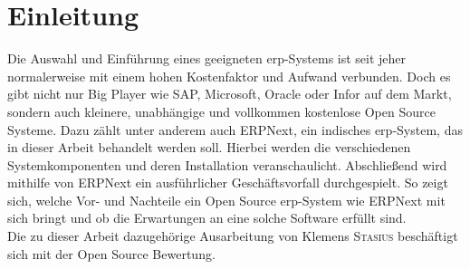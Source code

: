 \chapter{Einleitung}
\label{chap:einl}
Die Auswahl und Einführung eines geeigneten \gls{erp}-Systems ist seit jeher normalerweise mit einem hohen Kostenfaktor und Aufwand verbunden. Doch es gibt nicht nur Big Player wie SAP, Microsoft, Oracle oder Infor auf dem Markt, sondern auch kleinere, unabhängige und vollkommen kostenlose Open Source Systeme. Dazu zählt unter anderem auch ERPNext, ein indisches \gls{erp}-System, das in dieser Arbeit behandelt werden soll. Hierbei werden die verschiedenen Systemkomponenten und deren Installation veranschaulicht. Abschließend wird mithilfe von ERPNext ein ausführlicher Geschäftsvorfall durchgespielt. So zeigt sich, welche Vor- und Nachteile ein Open Source \gls{erp}-System wie ERPNext mit sich bringt und ob die Erwartungen an eine solche Software erfüllt sind. \\
Die zu dieser Arbeit dazugehörige Ausarbeitung von Klemens \textsc{Stasius} beschäftigt sich mit der Open Source Bewertung.